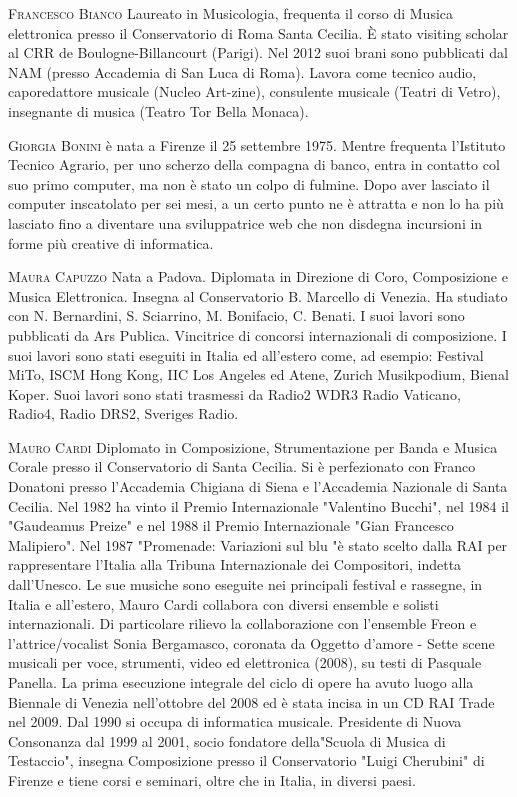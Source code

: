 \documentclass[9pt, twoside, a5paper]{extreport}
\newcommand{\biografia}[2]{%
\noindent \textsc{#1} %
#2 %
\medskip
}%
\begin{document}
\begin{multicols}{2}
\biografia{Francesco Bianco}{Laureato in Musicologia, frequenta il corso di Musica elettronica presso il Conservatorio di Roma Santa Cecilia. È stato visiting scholar al CRR de Boulogne-Billancourt (Parigi). Nel 2012 suoi brani sono pubblicati dal NAM (presso Accademia di San Luca di Roma). Lavora come tecnico audio, caporedattore musicale (Nucleo Art-zine), consulente musicale (Teatri di Vetro), insegnante di musica (Teatro Tor Bella Monaca).}

\biografia{Giorgia Bonini}{è nata a Firenze il 25 settembre 1975. Mentre frequenta l’Istituto Tecnico Agrario, per uno scherzo della compagna di banco, entra in contatto col suo primo computer, ma non è stato un colpo di fulmine. Dopo aver lasciato il computer inscatolato per sei mesi, a un certo punto ne è attratta e non lo ha più lasciato fino a diventare una sviluppatrice web che non disdegna incursioni in forme più creative di informatica.}

\biografia{Maura Capuzzo}{Nata a Padova. Diplomata in Direzione di Coro, Composizione e Musica Elettronica. Insegna al Conservatorio B. Marcello di Venezia. Ha studiato con N. Bernardini, S. Sciarrino, M. Bonifacio, C. Benati. I suoi lavori sono pubblicati da Ars Publica. Vincitrice di concorsi internazionali di composizione. I suoi lavori sono stati eseguiti in Italia ed all'estero come, ad esempio: Festival MiTo, ISCM Hong Kong, IIC Los Angeles ed Atene, Zurich Musikpodium, Bienal Koper. Suoi lavori sono stati trasmessi da Radio2 WDR3 Radio Vaticano, Radio4, Radio DRS2, Sveriges Radio.}

\biografia{Mauro Cardi}{Diplomato in Composizione, Strumentazione per Banda e Musica Corale presso il Conservatorio di Santa Cecilia. Si è perfezionato con Franco Donatoni presso l'Accademia Chigiana di Siena e l'Accademia Nazionale di Santa Cecilia. 
Nel 1982 ha vinto il Premio Internazionale "Valentino Bucchi", nel 1984 il "Gaudeamus Preize" e nel 1988 il Premio Internazionale "Gian Francesco Malipiero". Nel 1987 "Promenade: Variazioni sul blu "è stato scelto dalla RAI per rappresentare l'Italia alla Tribuna Internazionale dei Compositori, indetta dall'Unesco. Le sue musiche sono eseguite nei principali festival e rassegne, in Italia e all'estero, Mauro Cardi collabora con diversi ensemble e solisti internazionali. Di particolare rilievo la collaborazione con l'ensemble Freon e l'attrice/vocalist Sonia Bergamasco, coronata da Oggetto d'amore - Sette scene musicali per voce, strumenti, video ed elettronica (2008), su testi di Pasquale Panella. La prima esecuzione integrale del ciclo di opere ha avuto luogo alla Biennale di Venezia nell'ottobre del 2008 ed è stata incisa in un CD RAI Trade nel 2009. Dal 1990 si occupa di informatica musicale. Presidente di Nuova Consonanza dal 1999 al 2001, socio fondatore della"Scuola di Musica di Testaccio", insegna Composizione presso il Conservatorio "Luigi Cherubini" di Firenze e tiene corsi e seminari, oltre che in Italia, in diversi paesi.}


\end{multicols}
\end{document}
